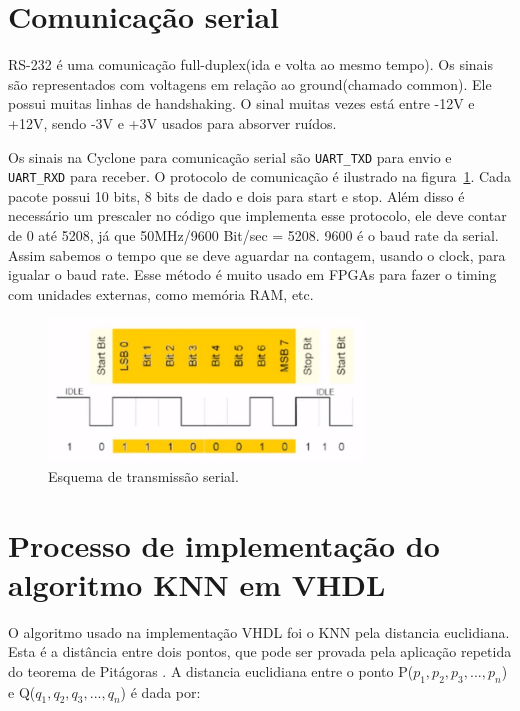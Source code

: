 \documentclass[12pt]{article}
\begin{document}
\section{Comunicação serial}

RS-232 é uma comunicação full-duplex(ida e volta ao mesmo tempo). Os sinais são
representados com voltagens em relação ao ground(chamado common). Ele possui 
muitas linhas de handshaking. O sinal muitas vezes está entre -12V e +12V,
sendo -3V e +3V usados para absorver ruídos.

Os sinais na Cyclone para comunicação serial são \verb|UART_TXD| para envio e
\verb|UART_RXD| para receber. O protocolo de comunicação é ilustrado na 
figura~\ref{simulacao}. Cada pacote possui 10 bits, 8 bits de dado e dois para
start e stop. Além disso é necessário um prescaler no código que implementa esse
protocolo, ele deve contar de 0 até 5208, já que 50MHz/9600 Bit/sec = 5208. 9600
é o baud rate da serial. Assim sabemos o tempo que se deve aguardar na contagem,
usando o clock, para igualar o baud rate. Esse método é muito usado em FPGAs
para fazer o timing com unidades externas, como memória RAM, etc.

\begin{figure}[!h]
\centering
\includegraphics[width=3.3in]{img/uart.png}
\caption{Esquema de transmissão serial.}
\label{simulacao}
\end{figure}

\section{Processo de implementação do algoritmo KNN em VHDL}

O algoritmo usado na implementação VHDL foi o KNN pela distancia euclidiana. 
Esta é a distância entre dois pontos, que pode ser provada pela aplicação
repetida do teorema de Pitágoras \cite{wiki:ieee754en}. A distancia euclidiana
entre o ponto P($p_1, p_2, p_3, ..., p_n$) e Q($q_1, q_2, q_3, ..., q_n$) é
dada por:
\end{document}
